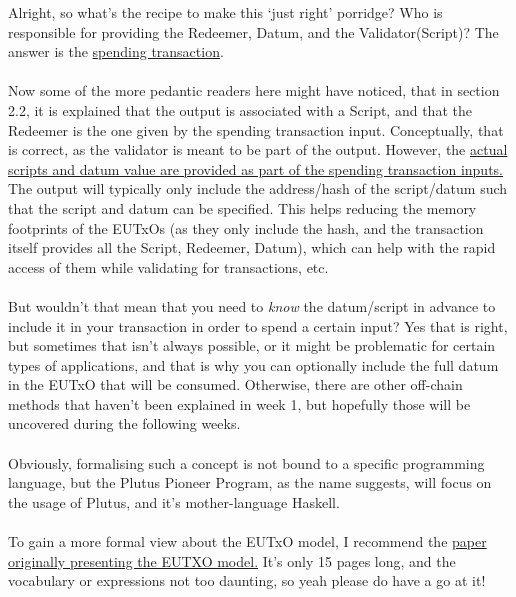 \documentclass[a4paper, 11pt]{article}
\begin{document}
    Alright, so what's the recipe to make this `just right' porridge? Who is responsible for providing the Redeemer, Datum, and the Validator(Script)? The answer is the \ul{spending transaction}. 
    
    \paragraph{}Now some of the more pedantic readers here might have noticed, that in section 2.2, it is explained that the output is associated with a Script, and that the Redeemer is the one given by the spending transaction input. Conceptually, that is correct, as the validator is meant to be part of the output. However, the \ul{actual scripts and datum value are provided as part of the spending transaction inputs.} The output will typically only include the address/hash of the script/datum such that the script and datum can be specified. This helps reducing the memory footprints of the EUTxOs (as they only include the hash, and the transaction itself provides all the Script, Redeemer, Datum), which can help with the rapid access of them while validating for transactions, etc.

    \paragraph{}But wouldn't that mean that you need to \emph{know} the datum/script in advance to include it in your transaction in order to spend a certain input? Yes that is right, but sometimes that isn't always possible, or it might be problematic for certain types of applications, and that is why you can optionally include the full datum in the EUTxO that will be consumed. Otherwise, there are other off-chain methods that haven't been explained in week 1, but hopefully those will be uncovered during the following weeks.

    \paragraph{} Obviously, formalising such a concept is not bound to a specific programming language, but the Plutus Pioneer Program, as the name suggests, will focus on the usage of Plutus, and it's mother-language Haskell. 

    \paragraph{} To gain a more formal view about the EUTxO model, I recommend the \href{https://iohk.io/en/research/library/papers/the-extended-utxo-model/}{paper originally presenting the EUTXO model.} It's only 15 pages long, and the vocabulary or expressions not too daunting, so yeah please do have a go at it!
    
\end{document}
